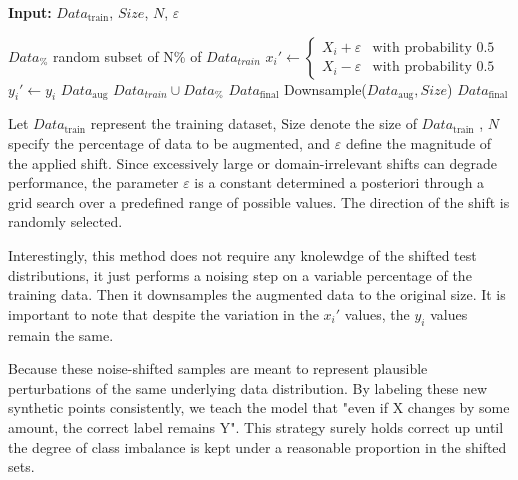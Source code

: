 \begin{algorithm}[H]
    \vspace{0.6em}
    \textbf{Input:} $Data_{\text{train}}$, $Size$, $N$, $\varepsilon$
    \vspace{0.6em}
    \begin{algorithmic}[1]
        \State $Data_{\%}$ \leftarrow random subset of N\% of $Data_{train}$
            \vspace{0.6em}
            \State $x_i' \leftarrow 
            \begin{cases}
                X_i + \varepsilon & \text{with probability } 0.5 \\
                X_i - \varepsilon & \text{with probability } 0.5
            \end{cases}$
            \State $y_i' \leftarrow y_i$
            \vspace{0.6em}
        \EndFor
        \vspace{0.6em}
        \State $Data_\text{aug}$ \leftarrow $Data_{train} \cup Data_{\%}$
        \State $Data_\text{final}$ \leftarrow Downsample($Data_\text{aug}, Size$)
        \vspace{0.6em}
        \State \Return $Data_{\text{final}}$
    \end{algorithmic}
    \caption{Let $Data_{\text{train}}$ represent the training dataset, $\text{Size}$ denote the size of $Data_{\text{train}}$ , $N$ specify the percentage of data to be augmented, and $\varepsilon$ define the magnitude of the applied shift. Since excessively large or domain-irrelevant shifts can degrade performance, the parameter $\varepsilon$ is a constant determined a posteriori through a grid search over a predefined range of possible values. The direction of the shift is randomly selected.}
\end{algorithm}



Interestingly, this method does not require any knolewdge of the shifted test distributions, it just performs a noising step on a variable percentage of the training data. Then it downsamples the augmented data to the original size.
It is important to note that despite the variation in the $x_i'$ values, the $y_i$ values remain the same.

\begin{tcolorbox}[colback=gray!5,colframe=gray!40,title= Why Keep the Same Label?]
    Because these noise-shifted samples are meant to represent plausible perturbations of the same underlying data distribution. By labeling these new synthetic points consistently, we teach the model that "even if X changes by some amount, the correct label remains Y". This strategy surely holds correct up until the degree of class imbalance is kept under a reasonable proportion in the shifted sets.
\end{tcolorbox}





